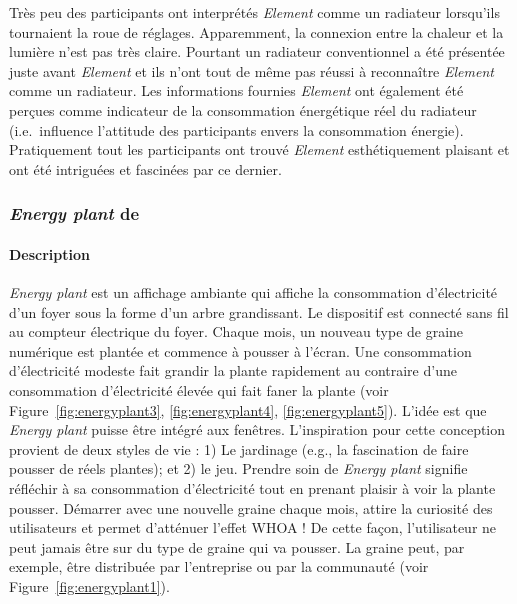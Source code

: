 \documentclass[10pt,a5paper,twoside]{article}
\begin{document}
Très peu des participants ont interprétés \emph{Element} comme un
radiateur lorsqu'ils tournaient la roue de réglages. Apparemment, la
connexion entre la chaleur et la lumière n'est pas très claire. Pourtant
un radiateur conventionnel a été présentée juste avant \emph{Element} et
ils n'ont tout de même pas réussi à reconnaître \emph{Element} comme un
radiateur. Les informations fournies \emph{Element} ont également été
perçues comme indicateur de la consommation énergétique réel du
radiateur (i.e.~influence l'attitude des participants envers la
consommation énergie). Pratiquement tout les participants ont trouvé
\emph{Element} esthétiquement plaisant et ont été intriguées et
fascinées par ce dernier.

\subsubsection{\emph{Energy plant} de
\citet{broms2009persuasive}}\label{energy-plant-de-broms2009persuasive}

\paragraph{Description}\label{description-9}

\emph{Energy plant} est un affichage ambiante qui affiche la
consommation d'électricité d'un foyer sous la forme d'un arbre
grandissant. Le dispositif est connecté sans fil au compteur électrique
du foyer. Chaque mois, un nouveau type de graine numérique est plantée
et commence à pousser à l'écran. Une consommation d'électricité modeste
fait grandir la plante rapidement au contraire d'une consommation
d'électricité élevée qui fait faner la plante (voir
Figure~\ref{fig:energyplant3}, \ref{fig:energyplant4},
\ref{fig:energyplant5}). L'idée est que \emph{Energy plant} puisse être
intégré aux fenêtres. L'inspiration pour cette conception provient de
deux styles de vie : 1) Le jardinage (e.g., la fascination de faire
pousser de réels plantes); et 2) le jeu. Prendre soin de \emph{Energy
plant} signifie réfléchir à sa consommation d'électricité tout en
prenant plaisir à voir la plante pousser. Démarrer avec une nouvelle
graine chaque mois, attire la curiosité des utilisateurs et permet
d'atténuer l'effet WHOA ! De cette façon, l'utilisateur ne peut jamais
être sur du type de graine qui va pousser. La graine peut, par exemple,
être distribuée par l'entreprise ou par la communauté (voir
Figure~\ref{fig:energyplant1}).
\end{document}
